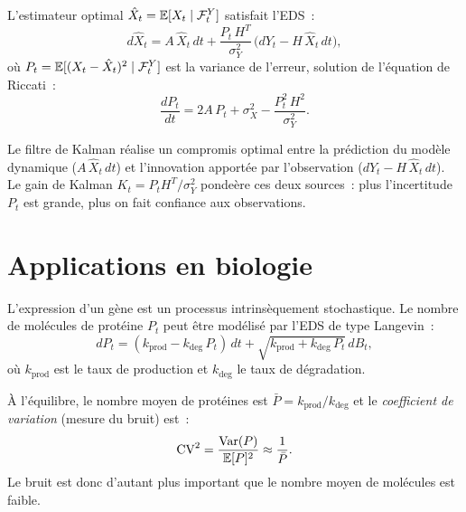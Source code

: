 \begin{theoreme}
\label{thm:kalman_bucy}
L'estimateur optimal $\hat{X}_t = \mathbb{E}[X_t \mid \mathcal{F}_t^Y]$
satisfait l'EDS~:
\[
  d\hat{X}_t = A\,\hat{X}_t\,dt
    + \frac{P_t\,H^T}{\sigma_Y^2}\,\bigl(dY_t - H\,\hat{X}_t\,dt\bigr),
\]
o\`u $P_t = \mathbb{E}[(X_t - \hat{X}_t)^2 \mid \mathcal{F}_t^Y]$ est la
variance de l'erreur, solution de l'\'equation de Riccati~:
\[
  \frac{dP_t}{dt} = 2A\,P_t + \sigma_X^2 - \frac{P_t^2\,H^2}{\sigma_Y^2}.
\]
\end{theoreme}

\begin{intuition}
Le filtre de Kalman r\'ealise un compromis optimal entre la pr\'ediction
du mod\`ele dynamique ($A\,\hat{X}_t\,dt$) et l'innovation apport\'ee
par l'observation ($dY_t - H\,\hat{X}_t\,dt$). Le gain de Kalman
$K_t = P_t H^T / \sigma_Y^2$ ponde\`ere ces deux sources~:
plus l'incertitude $P_t$ est grande, plus on fait confiance aux observations.
\end{intuition}

\section{Applications en biologie}
\label{sec:bio}

\begin{definition}
L'expression d'un g\`ene est un processus intrins\`equement stochastique.
Le nombre de mol\'ecules de prot\'eine $P_t$ peut \^etre mod\'elis\'e
par l'EDS de type Langevin~:
\[
  dP_t = (k_{\text{prod}} - k_{\text{deg}}\,P_t)\,dt
    + \sqrt{k_{\text{prod}} + k_{\text{deg}}\,P_t}\,dB_t,
\]
o\`u $k_{\text{prod}}$ est le taux de production et $k_{\text{deg}}$ le
taux de d\'egradation.
\end{definition}

\begin{proposition}
\`A l'\'equilibre, le nombre moyen de prot\'eines est
$\bar{P} = k_{\text{prod}}/k_{\text{deg}}$ et le \emph{coefficient
de variation} (mesure du bruit) est~:
\[
  \text{CV}^2 = \frac{\mathrm{Var}(P)}{\mathbb{E}[P]^2} \approx \frac{1}{\bar{P}}.
\]
Le bruit est donc d'autant plus important que le nombre moyen de
mol\'ecules est faible.
\end{proposition}

